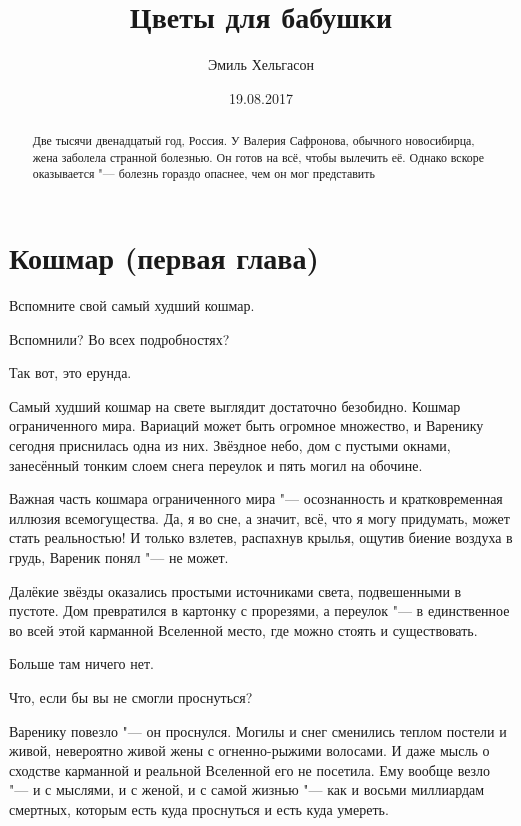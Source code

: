 \author{Эмиль Хельгасон}
\title{Цветы для бабушки}
\date{19.08.2017}
\maketitle

\begin{abstract}
Две тысячи двенадцатый год, Россия.
У Валерия Сафронова, обычного новосибирца, жена заболела странной болезнью.
Он готов на всё, чтобы вылечить её.
Однако вскоре оказывается "--- болезнь гораздо опаснее, чем он мог представить\ldotst
\end{abstract}

\tableofcontents

\section{Кошмар (первая глава)}

Вспомните свой самый худший кошмар.

Вспомнили?
Во всех подробностях?

Так вот, это ерунда.

Самый худший кошмар на свете выглядит достаточно безобидно.
Кошмар ограниченного мира.
Вариаций может быть огромное множество, и Варенику сегодня приснилась одна из них.
Звёздное небо, дом с пустыми окнами, занесённый тонким слоем снега переулок и пять могил на обочине.

Важная часть кошмара ограниченного мира "--- осознанность и кратковременная иллюзия всемогущества.
Да, я во сне, а значит, всё, что я могу придумать, может стать реальностью!
И только взлетев, распахнув крылья, ощутив биение воздуха в грудь, Вареник понял "--- не может.

Далёкие звёзды оказались простыми источниками света, подвешенными в пустоте.
Дом превратился в картонку с прорезями, а переулок "--- в единственное во всей этой карманной Вселенной место, где можно стоять и существовать.

Больше там ничего нет.

Что, если бы вы не смогли проснуться?

Варенику повезло "--- он проснулся.
Могилы и снег сменились теплом постели и живой, невероятно живой жены с огненно-рыжими волосами.
И даже мысль о сходстве карманной и реальной Вселенной его не посетила.
Ему вообще везло "--- и с мыслями, и с женой, и с самой жизнью "--- как и восьми миллиардам смертных, которым есть куда проснуться и есть куда умереть.

\razd

